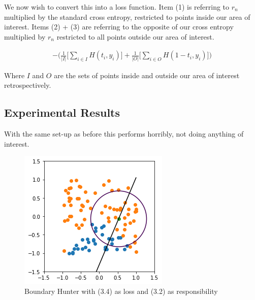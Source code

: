 \documentclass[notitlepage]{report}
\theoremstyle{definition}
\begin{document}
We now wish to convert this into a loss function. Item (1) is referring to $r_n$ multiplied by the standard cross entropy, restricted to points inside our area of interest. Items (2) + (3) are referring to the opposite of our cross entropy multiplied by $r_n$ restricted to all points outside our area of interest.

\begin{align}
- \big( \frac{1}{|I|} \big[ \sum_{i \in I} H(t_i, y_i) \big] + \frac{1}{|O|} \big[ \sum_{i \in O} H(1 - t_i, y_i) \big] \big)
\end{align}

Where $I$ and $O$ are the sets of points inside and outside our area of interest retrospectively.

\subsection{Experimental Results}

With the same set-up as before this performs horribly, not doing anything of interest.

\begin{figure}[H]
\centering
  \begin{minipage}[b]{0.4\textwidth}
    \includegraphics[width=\textwidth]{BoundaryHunter-Attempt2-01.png}
    \caption{Boundary Hunter with (3.4) as loss and (3.2) as responsibility}
  \end{minipage}
  \hfill
\end{figure}
\end{document}

